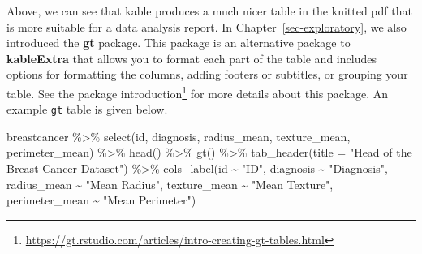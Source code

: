 \documentclass[
  letterpaper,
]{krantz}
\makeatletter
\newenvironment{Shaded}{\begin{snugshade}}{\end{snugshade}}
\newcommand{\AttributeTok}[1]{\textcolor[rgb]{0.40,0.45,0.13}{#1}}
\newcommand{\FunctionTok}[1]{\textcolor[rgb]{0.28,0.35,0.67}{#1}}
\newcommand{\NormalTok}[1]{\textcolor[rgb]{0.00,0.23,0.31}{#1}}
\newcommand{\SpecialCharTok}[1]{\textcolor[rgb]{0.37,0.37,0.37}{#1}}
\newcommand{\StringTok}[1]{\textcolor[rgb]{0.13,0.47,0.30}{#1}}
\renewcommand{\href}[2]{#2\footnote{\url{#1}}}
\newenvironment{kframe}{%
\medskip{}
\setlength{\fboxsep}{.8em}
 \def\at@end@of@kframe{}%
 \ifinner\ifhmode%
  \def\at@end@of@kframe{\end{minipage}}%
  \begin{minipage}{\columnwidth}%
 \fi\fi%
 \def\FrameCommand##1{\hskip\@totalleftmargin \hskip-\fboxsep
 \colorbox{shadecolor}{##1}\hskip-\fboxsep
     \hskip-\linewidth \hskip-\@totalleftmargin \hskip\columnwidth}%
 \MakeFramed {\advance\hsize-\width
   \@totalleftmargin\z@ \linewidth\hsize
   \@setminipage}}%
 {\par\unskip\endMakeFramed%
 \at@end@of@kframe}
\renewenvironment{Shaded}{\begin{kframe}}{\end{kframe}}
\makeatother
\begin{document}
\begin{table}[H]

\caption{\label{tab:unnamed-chunk-4}Head of the Breast Cancer Dataset}
\centering
{}
\end{table}

Above, we can see that kable produces a much nicer table in the knitted
pdf that is more suitable for a data analysis report. In
Chapter~\ref{sec-exploratory}, we also introduced the \textbf{gt}
package. This package is an alternative package to \textbf{kableExtra}
that allows you to format each part of the table and includes options
for formatting the columns, adding footers or subtitles, or grouping
your table. See the
\href{https://gt.rstudio.com/articles/intro-creating-gt-tables.html}{package
introduction} for more details about this package. An example
\texttt{gt} table is given below.

\begin{Shaded}
\begin{Highlighting}[]
\NormalTok{breastcancer }\SpecialCharTok{\%\textgreater{}\%} 
  \FunctionTok{select}\NormalTok{(id, diagnosis, radius\_mean, texture\_mean, perimeter\_mean) }\SpecialCharTok{\%\textgreater{}\%} 
  \FunctionTok{head}\NormalTok{() }\SpecialCharTok{\%\textgreater{}\%} 
  \FunctionTok{gt}\NormalTok{() }\SpecialCharTok{\%\textgreater{}\%}
  \FunctionTok{tab\_header}\NormalTok{(}\AttributeTok{title =} \StringTok{"Head of the Breast Cancer Dataset"}\NormalTok{) }\SpecialCharTok{\%\textgreater{}\%}
  \FunctionTok{cols\_label}\NormalTok{(id }\SpecialCharTok{\textasciitilde{}} \StringTok{"ID"}\NormalTok{, }
\NormalTok{             diagnosis }\SpecialCharTok{\textasciitilde{}} \StringTok{"Diagnosis"}\NormalTok{, }
\NormalTok{             radius\_mean }\SpecialCharTok{\textasciitilde{}} \StringTok{"Mean Radius"}\NormalTok{, }
\NormalTok{             texture\_mean }\SpecialCharTok{\textasciitilde{}} \StringTok{"Mean Texture"}\NormalTok{,}
\NormalTok{             perimeter\_mean }\SpecialCharTok{\textasciitilde{}} \StringTok{"Mean Perimeter"}\NormalTok{)}
\end{Highlighting}
\end{Shaded}
\end{document}
